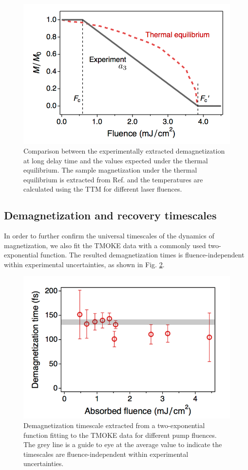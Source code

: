 \begin{figure}
	\label{fig: PRLSI4}
	\begin{center}
		\includegraphics[width=120mm]{figs/PRLSI4}
	\end{center}
	\caption{Comparison between the experimentally extracted demagnetization at long delay time and the values expected under the thermal equilibrium. The sample magnetization under the thermal equilibrium is extracted from Ref. \cite{Fognini2015} and the temperatures are calculated using the TTM for different laser fluences.}
\end{figure}

\subsection{Demagnetization and recovery timescales}

In order to further confirm the universal timescales of the dynamics of magnetization, we also fit the TMOKE data with a commonly used two-exponential function. The resulted demagnetization times is fluence-independent within experimental uncertainties, as shown in Fig. \ref{fig: PRLSI5}. 

\begin{figure}
	\label{fig: PRLSI5}
	\begin{center}
		\includegraphics[width=120mm]{figs/PRLSI5}
	\end{center}
	\caption{Demagnetization timescale extracted from a two-exponential function fitting to the TMOKE data for different pump fluences. The grey line is a guide to eye at the average value to indicate the timescales are fluence-independent within experimental uncertainties.}
\end{figure}

